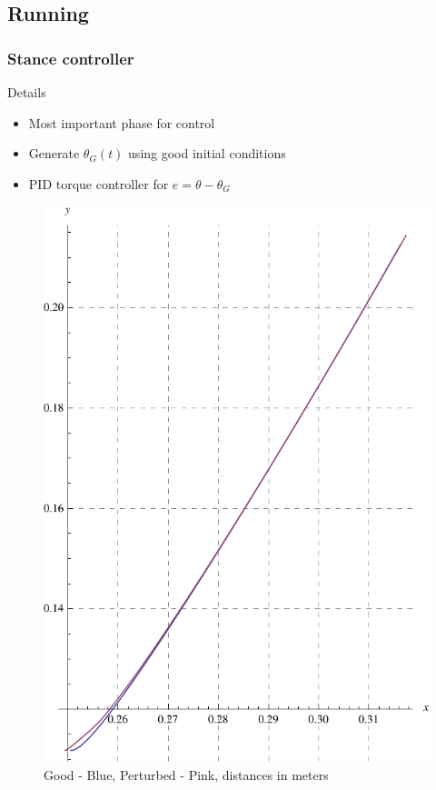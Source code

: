 \subsection*{Running}
\begin{frame}
\frametitle{Stance controller}
\begin{block}{Details}
\begin{itemize}
  \item
  Most important phase for control\\[0.1in]
  \item
  Generate $\theta_G(t)$ using good initial conditions\\[0.1in]
  \item
  PID torque controller for $e = \theta - \theta_G$\\[0.1in]
\end{itemize}
  \begin{figure}
  \centering
  \includegraphics[scale=0.4, angle = 270]{fig/pStance_trajec_control.pdf}
  \caption{Good - Blue, Perturbed - Pink, distances in meters}
  \label{fig:stance_control_trajec}
  \end{figure}

\end{block}
\end{frame}

